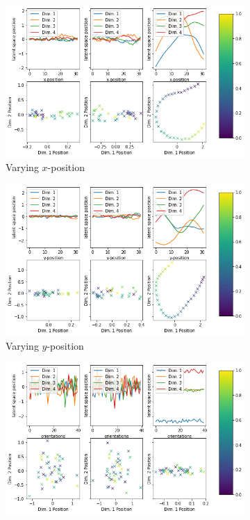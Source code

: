\begin{figure}
    \centering
    \begin{subfigure}{.48\textwidth}
        \centering
        \includegraphics[width=\textwidth]{images/latent_space_traversals/vlae_gan_dsprites_left_latent_space_values.png}
        \caption{Varying $x$-position}
    \end{subfigure}
    \hfill
    \begin{subfigure}{.48\textwidth}
        \centering
        \includegraphics[width=\textwidth]{images/latent_space_traversals/vlae_gan_dsprites_bottom_latent_space_values.png}
        \caption{Varying $y$-position}
    \end{subfigure}
    \vfill
    \begin{subfigure}{.48\textwidth}
        \centering
        \includegraphics[width=\textwidth]{images/latent_space_traversals/vlae_gan_dsprites_orientation_latent_space_values.png}

\end{subfigure}
\end{figure}
